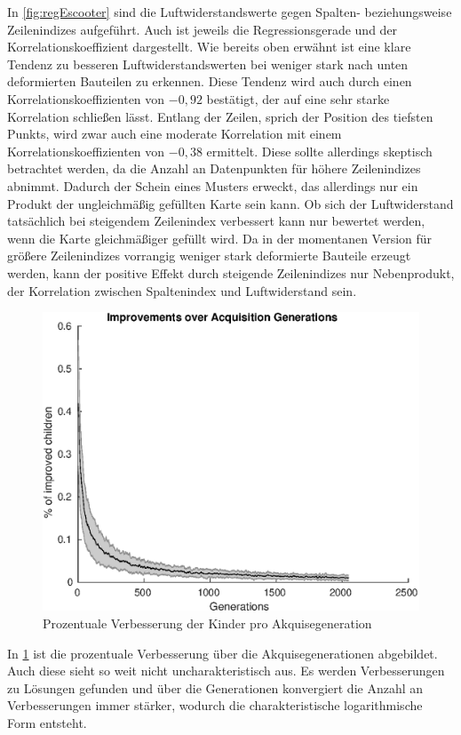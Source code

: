 In \cref{fig:regEscooter} sind die Luftwiderstandswerte gegen Spalten- beziehungsweise Zeilenindizes aufgeführt.
Auch ist jeweils die Regressionsgerade und der Korrelationskoeffizient dargestellt.
Wie bereits oben erwähnt ist eine klare Tendenz zu besseren Luftwiderstandswerten bei weniger stark nach unten deformierten Bauteilen zu erkennen.
Diese Tendenz wird auch durch einen Korrelationskoeffizienten von $-0,92$ bestätigt, der auf eine sehr starke Korrelation schließen lässt.
Entlang der Zeilen, sprich der Position des tiefsten Punkts, wird zwar auch eine moderate Korrelation mit einem Korrelationskoeffizienten von $-0,38$ ermittelt.
Diese sollte allerdings skeptisch betrachtet werden, da die Anzahl an Datenpunkten für höhere Zeilenindizes abnimmt.
Dadurch der Schein eines Musters erweckt, das allerdings nur ein Produkt der ungleichmäßig gefüllten Karte sein kann.
Ob sich der Luftwiderstand tatsächlich bei steigendem Zeilenindex verbessert kann nur bewertet werden, wenn die Karte gleichmäßiger gefüllt wird.
Da in der momentanen Version für größere Zeilenindizes vorrangig weniger stark deformierte Bauteile erzeugt werden, kann der positive Effekt durch steigende Zeilenindizes nur Nebenprodukt, der Korrelation zwischen Spaltenindex und Luftwiderstand sein.

\begin{figure}[h]
	\centering
	\includegraphics[width=.7\linewidth]{bilder/escooter/acqImprovements}
	\caption{Prozentuale Verbesserung der Kinder pro Akquisegeneration}
	\label{fig:escooteracqImprovement}
\end{figure}

In \cref{fig:escooteracqImprovement} ist die prozentuale Verbesserung über die Akquisegenerationen abgebildet.
Auch diese sieht so weit nicht uncharakteristisch aus.
Es werden Verbesserungen zu Lösungen gefunden und über die Generationen konvergiert die Anzahl an Verbesserungen immer stärker, wodurch die charakteristische logarithmische Form entsteht.

